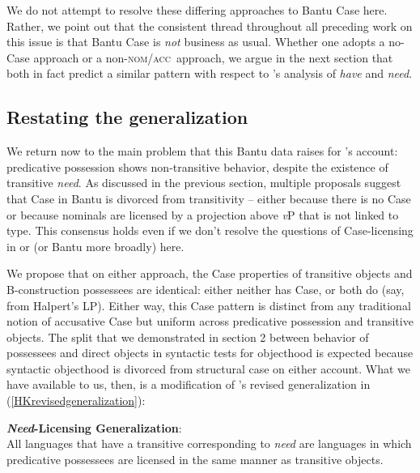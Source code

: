 \documentclass[output=paper,
modfonts
]{langscibook}
\begin{document}
We do not attempt to resolve these differing approaches to Bantu Case here. Rather, we point out that the consistent thread  throughout all preceding work on this issue is that Bantu Case
is {\it not} business as usual.  Whether one adopts a no-Case approach or a non-\textsc{nom}/\textsc{acc}\ approach, we argue in the next section that both in fact predict a similar pattern with respect to \citet{Harves:2012}'s analysis of {\it have} and {\it need}.

\subsection{Restating the generalization}
\largerpage[2]


We return now to the main problem that this Bantu data raises for \citet{Harves:2012}'s account: 
predicative possession shows non-transitive behavior, despite the
existence of transitive {\it need}. As discussed in the previous section, multiple proposals suggest that Case in Bantu is
divorced from transitivity -- either because there is no Case or
because nominals are licensed by a projection above {\it v}P that is  not linked to  type. This consensus holds
even if we don't resolve the questions of Case-licensing in  or
 (or Bantu more broadly) here. 
  
We propose  that on either approach, the Case properties of transitive
objects and B-construction  possessees are identical: either neither has Case, or both do (say, from Halpert's LP). Either way, this Case
pattern is distinct from any traditional notion of accusative
Case but uniform across predicative possession and transitive
objects. The split that we demonstrated in section 2 between behavior of possessees and direct objects in syntactic tests for objecthood  is expected  because syntactic objecthood is divorced from structural case on either account. 
What we have
available to us, then, is a modification of \citet{Harves:2012}'s
revised generalization in (\ref{HKrevisedgeneralization}):



\begin{exe} 
\ex\label{NeedLicensingGeneralization} \textbf{{\it Need}-Licensing Generalization}:\\
All languages that have a transitive  corresponding to {\it need}
are languages in which 
predicative possessees are licensed in the same manner as transitive objects.
\end{exe}
\end{document}
